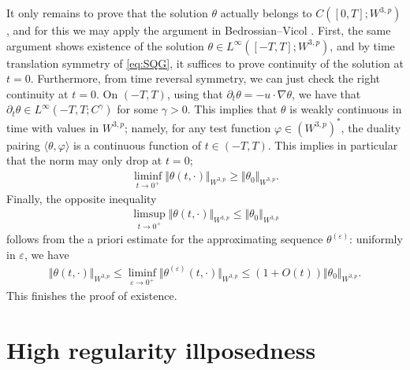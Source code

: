 \documentclass[10pt]{amsart}
\theoremstyle{definition}
\theoremstyle{remark}
\numberwithin{equation}{section}
\newcommand{\nrm}[1]{\Vert#1\Vert}
\newcommand{\brk}[1]{\langle#1\rangle}
\newcommand{\rd}{\partial}
\newcommand{\nb}{\nabla}
\newcommand{\0}{\emptyset}
\newcommand{\gmm}{\gamma}
\newcommand{\tht}{\theta}
\newcommand{\varep}{\varepsilon}
\begin{document}
        {It only remains to prove that the solution $\tht$ actually belongs to $C([0,T];W^{3,p})$, and for this we may apply the argument in Bedrossian--Vicol \cite[pp. 44-45]{BV}. First, the same argument shows existence of the solution $\tht \in L^{\infty}([-T,T];W^{3,p})$, and by time translation symmetry of \eqref{eq:SQG}, it suffices to prove continuity of the solution at $t = 0 $. Furthermore, from time reversal symmetry, we can just check the right continuity at $t = 0$. On $(-T,T)$, using that $\rd_t\tht = -u\cdot\nb\tht$, we have that $\rd_t\tht \in L^{\infty}(-T,T;C^{\gmm})$ for some $\gmm>0$. This implies that $\tht$ is weakly continuous in time with values in $W^{3,p}$; namely, for any test function $\varphi \in (W^{3,p})^*$, the duality pairing $\brk{ \tht, \varphi }$ is a continuous function of $t \in (-T,T)$. This implies in particular that the norm may only drop at $t = 0$; \begin{equation*}
        		\begin{split}
        			\liminf_{t\to 0^+} \nrm{\tht(t,\cdot)}_{W^{3,p}} \ge \nrm{\tht_{0}}_{W^{3,p}}. 
        		\end{split}
        \end{equation*} Finally, the opposite inequality \begin{equation*}
        \begin{split}
        	\limsup_{t\to 0^+} \nrm{\tht(t,\cdot)}_{W^{3,p}} \le \nrm{\tht_{0}}_{W^{3,p}}
        \end{split}
    \end{equation*}  follows from the a priori estimate for the approximating sequence $\tht^{(\varep)}$: uniformly in $\varep$, we have \begin{equation*}
    \begin{split}
    	\nrm{\tht(t,\cdot)}_{W^{3,p}} \le \liminf_{\varepsilon\to 0^+}\nrm{\tht^{(\varep)}(t,\cdot)}_{W^{3,p}} \le (1+O(t))\nrm{\tht_{0}}_{W^{3,p}}. 
    \end{split}
\end{equation*}This finishes the proof of existence. }
        
        
        
        
		
		\section{High regularity illposedness}\label{sec:illposed}
		
	
		
\end{document}
